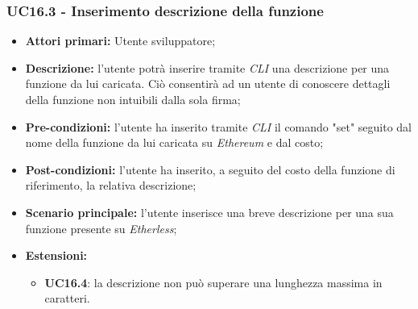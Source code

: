 \subsubsection{UC16.3 - Inserimento descrizione della funzione}
\begin{itemize}
	\item \textbf{Attori primari:} Utente sviluppatore;
	\item \textbf{Descrizione:} l'utente potrà inserire tramite \textit{CLI\glo} una descrizione per una funzione da lui caricata. Ciò consentirà ad un utente di conoscere dettagli della funzione non intuibili dalla sola firma; 
	\item \textbf{Pre-condizioni:} l'utente ha inserito tramite \textit{CLI\glo} il comando "set" seguito dal nome della funzione da lui caricata su \textit{Ethereum\glo} e dal costo;
	\item \textbf{Post-condizioni:} l'utente ha inserito, a seguito del costo della funzione di riferimento, la relativa descrizione;
	\item \textbf{Scenario principale:} l'utente inserisce una breve descrizione per una sua funzione presente su \textit{Etherless};
	\item \textbf{Estensioni:} 
	\begin{itemize}
		\item \textbf{UC16.4}: la descrizione non può superare una lunghezza massima in caratteri.
	\end{itemize}
\end{itemize}